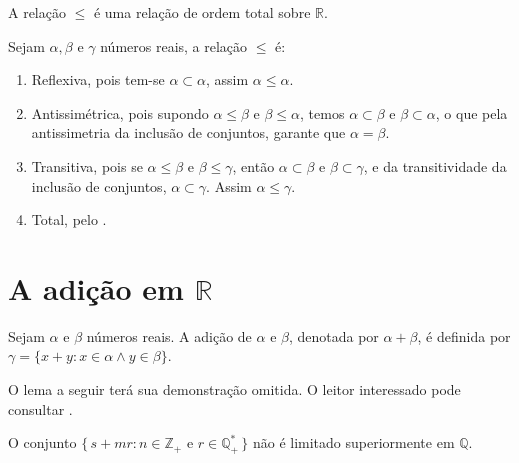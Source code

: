 \documentclass[../main.tex]{subfiles}
\begin{document}
\begin{teo}\label{reais-teo-ordemTotal}
    A relação $\leq$ é uma relação de ordem total sobre $\mathbb{R}$.
\end{teo}
\begin{dem}
    Sejam $\alpha, \beta$ e $\gamma$ números reais, a relação $\leq$ é:
    \begin{enumerate}[label=(\roman*)]
        \item Reflexiva, pois tem-se $\alpha \subset \alpha$, assim $\alpha \leq \alpha$.
        \item Antissimétrica, pois supondo $\alpha \leq \beta$ e $\beta \leq \alpha$, temos $\alpha \subset \beta$ e $\beta \subset \alpha$, o que pela antissimetria da inclusão de conjuntos, garante que $\alpha = \beta$.
        \item Transitiva, pois se $\alpha \leq \beta$ e $\beta \leq \gamma$, então $\alpha \subset \beta$ e $\beta \subset \gamma$, e da transitividade da inclusão de conjuntos, $\alpha \subset \gamma$. Assim $\alpha \leq \gamma$.
        \item Total, pelo .
    \end{enumerate}
\end{dem}

\section{A adição em $\mathbb{R}$}
\begin{defi}\label{reais-def-adicao}
    Sejam $\alpha$ e $\beta$ números reais. A adição de $\alpha$ e $\beta$, denotada por $\alpha + \beta$, é definida por $\gamma = \{ x + y : x \in \alpha \land y \in \beta \}$.
\end{defi}

O lema a seguir terá sua demonstração omitida. O leitor interessado pode consultar \textcite[p. 73]{ferreira}.
\begin{lema}
    O conjunto $\{\,s + mr : n \in \mathbb{Z}_{+} \text{ e } r \in \mathbb{Q}_{+}^* \,\}$ não é limitado superiormente em $\mathbb{Q}$.
\end{lema}
\end{document}
